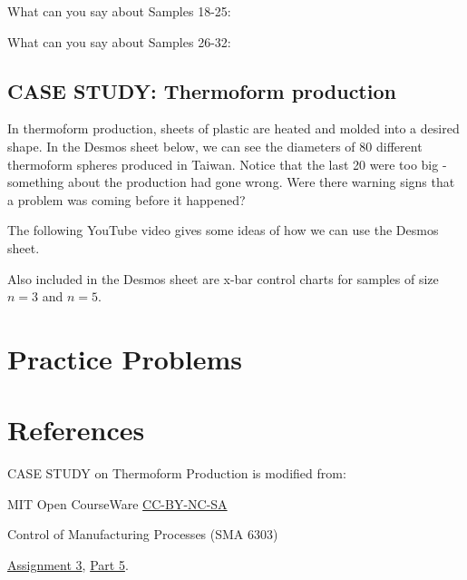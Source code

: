 \documentclass{ximera}
\begin{document}
\begin{problem}
What can you say about Samples  18-25:
\begin{multipleChoice}
\end{multipleChoice}

What can you say about Samples  26-32:
\begin{multipleChoice}
\end{multipleChoice}
\end{problem}

\subsection*{CASE STUDY: Thermoform production}

In thermoform production, sheets of plastic are heated and molded into a desired shape.  In the Desmos sheet below, we can see the diameters of 80 different thermoform spheres produced in Taiwan.  Notice that the last 20 were too big - something about the production had gone wrong.  Were there warning signs that a problem was coming before it happened?


The following YouTube video gives some ideas of how we can use the Desmos sheet.


Also included in the Desmos sheet are x-bar control charts for samples of size $n=3$ and $n=5$.  


\section*{Practice Problems}

\section*{References}
CASE STUDY on Thermoform Production is modified from:

MIT Open CourseWare \href{https://creativecommons.org/licenses/by-nc-sa/4.0/}{CC-BY-NC-SA}

Control of Manufacturing Processes (SMA 6303)

\href{https://ocw.mit.edu/courses/2-830j-control-of-manufacturing-processes-sma-6303-spring-2008/resources/ps3/}{Assignment 3}, \href{https://ocw.mit.edu/courses/2-830j-control-of-manufacturing-processes-sma-6303-spring-2008/resources/35/}{Part 5}. 
\end{document}
